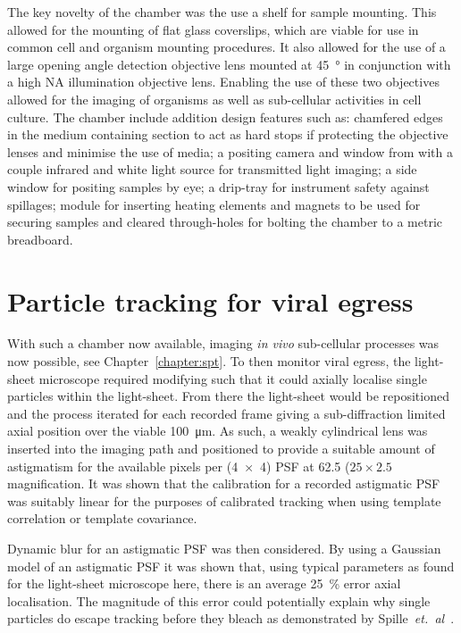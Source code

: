 The key novelty of the chamber was the use a shelf for sample mounting.
This allowed for the mounting of flat glass coverslips, which are viable for use in common cell and organism mounting procedures.
It also allowed for the use of a large opening angle detection objective lens mounted at \SI{45}{\degree} in conjunction with a high NA illumination objective lens.
Enabling the use of these two objectives allowed for the imaging of organisms as well as sub-cellular activities in cell culture.
The chamber include addition design features such as: chamfered edges in the medium containing section to act as hard stops if protecting the objective lenses and minimise the use of media; a positing camera and window from with a couple infrared and white light source for transmitted light imaging; a side window for positing samples by eye; a drip-tray for instrument safety against spillages; module for inserting heating elements and magnets to be used for securing samples and cleared through-holes for bolting the chamber to a metric breadboard.

\section{Particle tracking for viral egress}
With such a chamber now available, imaging \emph{in vivo} sub-cellular processes was now possible, see Chapter~\ref{chapter:spt}.
To then monitor viral egress, the light-sheet microscope required modifying such that it could axially localise single particles within the light-sheet.
From there the light-sheet would be repositioned and the process iterated for each recorded frame giving a sub-diffraction limited axial position over the viable \SI{100}{\micro\meter}.
As such, a weakly cylindrical lens was inserted into the imaging path and positioned to provide a suitable amount of astigmatism for the available pixels per (\SI{4x4}{}) \gls{PSF} at 62.5 (\(25\times2.5\) magnification.
It was shown that the calibration for a recorded astigmatic \gls{PSF} was suitably linear for the purposes of calibrated tracking when using template correlation or template covariance.

Dynamic blur for an astigmatic \gls{PSF} was then considered.
By using a Gaussian model of an astigmatic \gls{PSF} it was shown that, using typical parameters as found for the light-sheet microscope here, there is an average \SI{25}{\percent} error axial localisation.
The magnitude of this error could potentially explain why single particles do escape tracking before they bleach as demonstrated by Spille~\emph{et.~al}~\cite{spilleDirectObservationMobility2015}.

